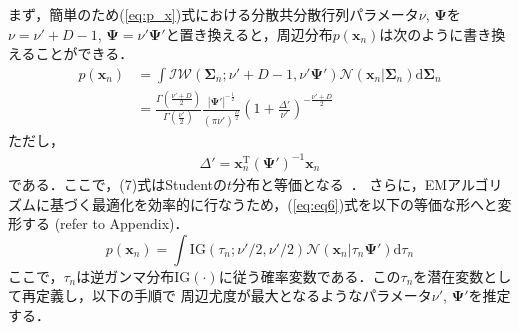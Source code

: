 \documentclass[journal]{IEEEtran}
\begin{document}
まず，簡単のため(\ref{eq:p_x})式における分散共分散行列パラメータ$\nu$, $\bm \Psi$を$\nu= \nu' +D-1$, $\bm \Psi = \nu' \bm{\Psi}'$と置き換えると，周辺分布$p(\mathbf{x}_n)$は次のように書き換えることができる．
\begin{align}%
\label{eq:eq6}
p(\mathbf{x}_n) &=\int \mathcal{IW}(\bm{\Sigma}_n; \nu'+D-1, \nu' \bm{\Psi}') \mathcal{N}(\mathbf{x}_n|\bm{\Sigma}_n) \mathrm{d} {\bm{\Sigma}_n} \\
\label{eq:eq7}
&=\frac{\Gamma(\frac{\nu'+D}{2})}{\Gamma(\frac{\nu'}{2})} \frac{|{\bm \Psi'}|^{-\frac{1}{2}}}{\left(\pi \nu' \right)^{\frac{D}{2}}} \left(1+\frac{\Delta '}{\nu '} \right)^{-\frac{\nu'+D}{2}}
\end{align}
ただし，
\begin{eqnarray}
	\Delta ' = \mathbf{x}_n^\mathrm{T} ({\bm \Psi '})^{-1} \mathbf{x}_n
\end{eqnarray}
である．ここで，(7)式はStudentの$t$分布と等価となる~\cite{t2006}．
さらに，EMアルゴリズムに基づく最適化を効率的に行なうため，(\ref{eq:eq6})式を以下の等価な形へと変形する (refer to Appendix)．
\begin{equation}%
\label{eq:eq9}
		p(\mathbf{x}_n) = \int \mathrm{IG}(\tau_n;\nu'/2,\nu'/2) \mathcal{N}(\mathbf{x}_n|\tau_n \mathbf{\Psi}') \mathrm{d}{\tau_n}
\end{equation}
ここで，$\tau_n$は逆ガンマ分布$\mathrm{IG}(\cdot)$に従う確率変数である．この$\tau_n$を潜在変数として再定義し，以下の手順で
周辺尤度が最大となるようなパラメータ$\nu'$, ${\bm \Psi'}$を推定する．
\end{document}
